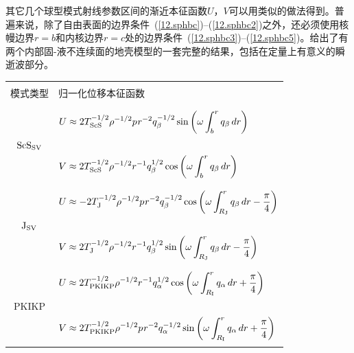 其它几个球型模式射线参数区间的渐近本征函数$U$，$V$可以用类似的做法得到。普遍来说，除了自由表面的边界条件~(\ref{12.sphbc})--(\ref{12.sphbc2})之外，还必须使用核幔边界$r=b$和内核边界$r=c$处的边界条件~(\ref{12.sphbc3})--(\ref{12.sphbc5})。\textcite{zhao&dahlen95a}给出了有两个内部固-液不连续面的地壳模型的一套完整的结果，包括在定量上有意义的瞬逝波部分。
\begin{table}[!t]
\centering
\begin{tabular}{|c|l|} \hline
                  &      \\
模式类型 & \hspace{0.9 cm}归一化位移本征函数  \\
                  &      \\ \hline
                  &      \\
& $\displaystyle U\approx 2T_{\rm ScS}^{-1/2}\rho^{-1/2}p\hspace{0.2 mm}r^{-2}
q_{\beta}^{-1/2}\sin\left(\omega\int_b^rq_{\beta}\,dr\right)$ \\
${\rm ScS}_{\rm SV}$  &        \\
& $\displaystyle V\approx 2T_{\rm ScS}^{-1/2}\rho^{-1/2}r^{-1}
q_{\beta}^{1/2}\cos\left(\omega\int_b^rq_{\beta}\,dr\right)$ \\
       &         \\ \hline
                  &      \\
& $\displaystyle U\approx -2T_{\rm J}^{-1/2}\rho^{-1/2}p\hspace{0.2 mm}r^{-2}
q_{\beta}^{-1/2}\cos\left(\omega\int_{R_{\rm J}}^rq_{\beta}\,dr
-\frac{\pi}{4}\right)$ \\
${\rm J}_{\rm SV}$  &        \\
& $\displaystyle V\approx 2T_{\rm J}^{-1/2}\rho^{-1/2}r^{-1}
q_{\beta}^{1/2}\sin\left(\omega\int_{R_{\rm J}}^rq_{\beta}\,dr
-\frac{\pi}{4}\right)$ \\
       &         \\ \hline
                  &      \\
& $\displaystyle U\approx 2T_{\rm PKIKP}^{-1/2}\rho^{-1/2}r^{-1}
q_{\alpha}^{1/2}\cos\left(\omega\int_{R_{\rm I}}^rq_{\alpha}\,dr
+\frac{\pi}{4}\right)$ \\
PKIKP  &        \\
& $\displaystyle V\approx 2T_{\rm PKIKP}^{-1/2}\rho^{-1/2}p\hspace{0.2 mm}r^{-2}
q_{\alpha}^{-1/2}\sin\left(\omega\int_{R_{\rm I}}^rq_{\alpha}\,dr
+\frac{\pi}{4}\right)$ \\
       &         \\ \hline

\end{tabular}
\end{table}
